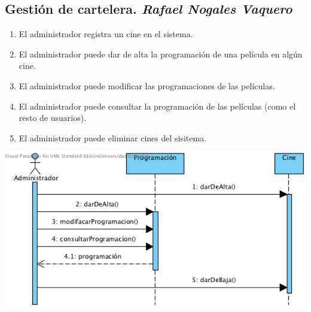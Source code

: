 \documentclass{article}
\begin{document}
	\subsection*{Gestión de cartelera. \textit{Rafael Nogales Vaquero}}
	\begin{enumerate}
		\item El administrador registra un cine en el sistema.
		\item El administrador puede dar de alta la programación de una película en algún cine.
		\item El administrador puede modificar las programaciones de las películas.
		\item El administrador puede consultar la programación de las películas (como el resto de usuarios).
		\item El administrador puede eliminar cines del sisitema.
	\end{enumerate}
			\includegraphics[width=1\linewidth]{./Sec-Cartelera}
\end{document}
